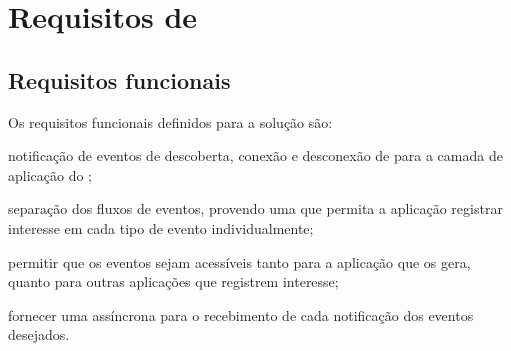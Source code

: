\section{Requisitos de \software}

\subsection*{Requisitos funcionais}

Os requisitos funcionais definidos para a solução são:

\begin{alineas}
	\item notificação de eventos de descoberta, conexão e desconexão de \smartobjs para a camada de aplicação do \software;

	\item separação dos fluxos de eventos, provendo uma \api que permita a aplicação registrar interesse em cada tipo de evento individualmente;

	\item permitir que os eventos sejam acessíveis tanto para a aplicação que os gera, quanto para outras aplicações que registrem interesse;

	\item fornecer uma \api assíncrona para o recebimento de cada notificação dos eventos desejados.
\end{alineas}


